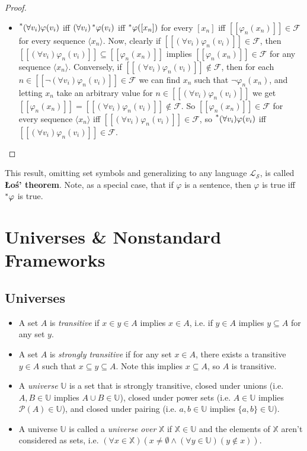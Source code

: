 \documentclass{article}
\newcommand{\hr}[1]{\prescript{*}{}{#1}}
\begin{document}
\begin{proof}
\begin{itemize}
        \item $\hr{(\forall v_i)\varphi(v_i)}$ iff $(\forall v_i)\hr{\varphi}(v_i)$ iff $\hr{\varphi}([x_n])$ for every $[x_n]$ iff $[[\varphi_n(x_n)]] \in \mathcal{F}$ for every sequence $\langle x_n \rangle$. Now, clearly if $[[(\forall v_i)\varphi_n(v_i)]] \in \mathcal{F}$, then $[[(\forall v_i)\varphi_n(v_i)]] \subseteq [[\varphi_n(x_n)]]$ implies $[[\varphi_n(x_n)]] \in \mathcal{F}$ for any sequence $\langle x_n \rangle$. Conversely, if $[[(\forall v_i)\varphi_n(v_i)]] \notin \mathcal{F}$, then for each $n \in [[\neg(\forall v_i)\varphi_n(v_i)]] \in \mathcal{F}$ we can find $x_n$ such that $\neg \varphi_n(x_n)$, and letting $x_n$ take an arbitrary value for $n \in [[(\forall v_i)\varphi_n(v_i)]]$ we get $[[\varphi_n(x_n)]] = [[(\forall v_i)\varphi_n(v_i)]] \notin \mathcal{F}$. So $[[\varphi_n(x_n)]] \in \mathcal{F}$ for every sequence $\langle x_n \rangle$ iff $[[(\forall v_i)\varphi_n(v_i)]] \in \mathcal{F}$, so $\hr{(\forall v_i)\varphi(v_i)}$ iff $[[(\forall v_i)\varphi_n(v_i)]] \in \mathcal{F}$.
    \end{itemize}
\end{proof}

This result, omitting set symbols and generalizing to any language $\mathcal{L}_\mathcal{S}$, is called \textbf{\L o\'s' theorem}. Note, as a special case, that if $\varphi$ is a sentence, then $\varphi$ is true iff $\hr{\varphi}$ is true.

\section{Universes \& Nonstandard Frameworks}
\subsection{Universes}
\begin{itemize}
    \item A set $A$ is \textit{transitive} if $x \in y \in A$ implies $x \in A$, i.e. if $y \in A$ implies $y \subseteq A$ for any set $y$.

    \item A set $A$ is \textit{strongly transitive} if for any set $x \in A$, there exists a transitive $y \in A$ such that $x \subseteq y \subseteq A$. Note this implies $x \subseteq A$, so $A$ is transitive.

    \item A \textit{universe} $\mathbb{U}$ is a set that is strongly transitive, closed under unions (i.e. $A, B \in \mathbb{U}$ implies $A \cup B \in \mathbb{U}$), closed under power sets (i.e. $A \in \mathbb{U}$ implies $\mathcal P(A) \in \mathbb{U}$), and closed under pairing (i.e. $a, b \in \mathbb{U}$ implies $\{a, b\} \in \mathbb{U}$).
    
    \item A universe $\mathbb{U}$ is called a \textit{universe over} $\mathbb{X}$ if $\mathbb{X} \in \mathbb{U}$ and the elements of $\mathbb{X}$ aren't considered as sets, i.e. $(\forall x \in \mathbb{X})(x \neq \emptyset \land (\forall y \in \mathbb{U}) (y \notin x))$.
\end{itemize}
\end{document}
